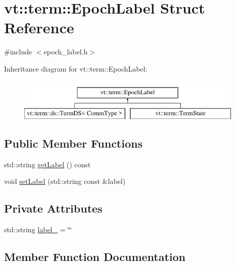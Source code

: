 \hypertarget{structvt_1_1term_1_1_epoch_label}{}\section{vt\+:\+:term\+:\+:Epoch\+Label Struct Reference}
\label{structvt_1_1term_1_1_epoch_label}


{\ttfamily \#include $<$epoch\+\_\+label.\+h$>$}

Inheritance diagram for vt\+:\+:term\+:\+:Epoch\+Label\+:\begin{figure}[H]
\begin{center}
\leavevmode
\includegraphics[height=2.000000cm]{structvt_1_1term_1_1_epoch_label}
\end{center}
\end{figure}
\subsection*{Public Member Functions}
\begin{DoxyCompactItemize}
\item 
std\+::string \hyperlink{structvt_1_1term_1_1_epoch_label_af480e2eb3a58aa315923ed241caac916}{get\+Label} () const
\item 
void \hyperlink{structvt_1_1term_1_1_epoch_label_ac140591669a7a6773626612feefe6009}{set\+Label} (std\+::string const \&label)
\end{DoxyCompactItemize}
\subsection*{Private Attributes}
\begin{DoxyCompactItemize}
\item 
std\+::string \hyperlink{structvt_1_1term_1_1_epoch_label_a382a1d7b4748e26ba2bc0200636379e6}{label\+\_\+} = \char`\"{}\char`\"{}
\end{DoxyCompactItemize}


\subsection{Member Function Documentation}
\mbox{\label{structvt_1_1term_1_1_epoch_label_af480e2eb3a58aa315923ed241caac916}} 
